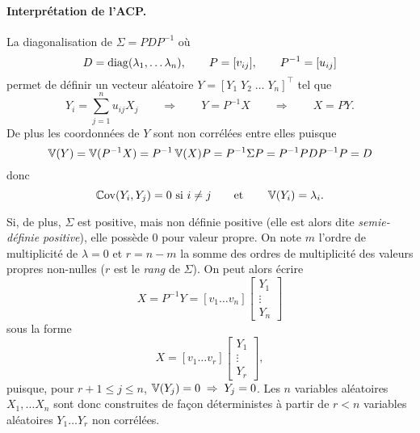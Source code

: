 
\paragraph*{Interprétation de l'ACP.}
La diagonalisation de $\Sigma = P D P^{-1}$ où
$$
D = \operatorname{diag}(\lambda_1, \dots \lambda_n), \qquad
P = [v_{ij}], \qquad
P^{-1} = [u_{ij}]
$$
permet de définir un vecteur aléatoire $Y = [Y_1 \; Y_2 \; \dots \; Y_n]^\top$ tel que
$$
Y_i = \sum_{j=1}^n u_{ij} X_j
\qquad \Rightarrow \qquad
Y = P^{-1} X
\qquad \Rightarrow \qquad
X = P Y.
$$
De plus les coordonnées de $Y$ sont non corrélées entre elles puisque
$$
\operatorname{\mathbb{V}}(Y) = \operatorname{\mathbb{V}}(P^{-1} X) = P^{-1} \operatorname{\mathbb{V}}(X) P = P^{-1} \Sigma P = P^{-1} P D P^{-1} P = D
$$
donc
$$
\operatorname{\mathbb{C}ov}(Y_i, Y_j) = 0 \text{ si } i \neq j 
\qquad \text{et} \qquad
\operatorname{\mathbb{V}}(Y_i) = \lambda_i.
$$

Si, de plus, $\Sigma$ est positive, mais non définie positive (elle est alors dite {\em semie-définie positive}), elle possède 0 pour valeur propre. On note $m$ l'ordre de multiplicité de $\lambda = 0$ et $r = n-m$ la somme des ordres de multiplicité des valeurs propres non-nulles ($r$ est le {\em rang} de $\Sigma$). On peut alors écrire
$$
X = P^{-1} Y = [v_1 \dots v_n] \left[\begin{array}{c} Y_1 \\ \vdots \\ Y_n \end{array} \right]
$$
sous la forme
$$
X = [v_1 \dots v_r] \left[\begin{array}{c} Y_1 \\ \vdots \\ Y_r \end{array} \right],
$$
puisque, pour $r+1 \leq j \leq n$, $\operatorname{\mathbb{V}}(Y_j) = 0 \; \Rightarrow \; Y_j = 0$.
Les $n$ variables aléatoires $X_1, \dots X_n$ sont donc construites de façon déterministes à partir de $r < n$ variables aléatoires $Y_1 \dots Y_r$ non corrélées.


